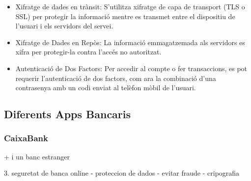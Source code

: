 \begin{itemize}
    \item Xifratge de dades en trànsit: S'utilitza xifratge de capa de transport (TLS o SSL) per protegir la informació mentre es transmet entre el dispositiu de l'usuari i els servidors del servei.
    \item Xifratge de Dades en Repòs: La informació emmagatzemada als servidors es xifra per protegir-la contra l'accés no autoritzat.
    \item Autenticació de Dos Factors: Per accedir al compte o fer transaccions, es pot requerir l'autenticació de dos factors, com ara la combinació d'una contrasenya amb un codi enviat al telèfon mòbil de l'usuari.
\end{itemize}


\subsection*{Diferents Apps Bancaris}




\subsubsection{CaixaBank}




+ i un banc estranger 



3. seguretat de banca online
    - proteccion de dados
    - evitar fraude
    - cripografia
